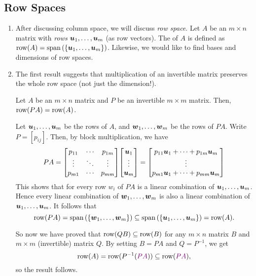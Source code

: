 \subsection{Row Spaces}
\begin{enumerate}
\item After discussing column space, we will discuss \emph{row space}. Let
\(A\) be an \(m\times n\) matrix with \emph{rows}
\(\vb*{u}_1,\dotsc,\vb*{u}_m\) (as row vectors). The  of
\(A\) is defined as \(\operatorname{row}(A)=\operatorname{span}\qty(\{\vb*{u}_1,\dotsc,\vb*{u}_m\})\).
Likewise, we would like to find bases and dimensions of row spaces.

\item The first result suggests that multiplication of an invertible matrix
preserves the whole row space (not just the dimension!).

\begin{theorem}
\label{thm:mult-inv-matx-preserv-row-space}
Let \(A\) be an \(m\times n\) matrix and \(P\) be an invertible \(m\times m\)
matrix. Then, \(\operatorname{row}(PA)=\operatorname{row}(A)\).
\end{theorem}
\begin{pf}
Let \(\vb*{u}_1,\dotsc,\vb*{u}_m\) be the rows of \(A\), and
\(\vb*{w}_1,\dotsc,\vb*{w}_m\) be the rows of \(PA\). Write \(P=[p_{ij}]\).
Then, by block multiplication, we have
\[
PA=\mqty[p_{11}&\cdots&p_{1m}\\ \vdots&\ddots&\vdots\\ p_{m1}&\cdots&p_{mm}]
\mqty[\vect{u}_1\\ \vdots\\ \vect{u}_m]
=\mqty[
p_{11}\vect{u}_1+\dotsb+p_{1m}\vect{u}_m\\
\vdots\\
p_{m1}\vect{u}_1+\dotsb+p_{mm}\vect{u}_m
]
\]
This shows that for every row \(w_i\) of \(PA\) is a linear combination of
\(\vb*{u}_1,\dotsc,\vb*{u}_m\). Hence every linear combination of
\(\vb*{w}_1,\dotsc,\vb*{w}_m\) is also a linear combination of
\(\vb*{u}_1,\dotsc,\vb*{u}_m\). It follows that
\[
\operatorname{row}(PA)=\operatorname{span}\qty(\{\vb*{w}_1,\dotsc,\vb*{w}_m\})\subseteq
\operatorname{span}\qty(\{\vb*{u}_1,\dotsc,\vb*{u}_m\})=\operatorname{row}(A).
\]

So now we have proved that \(\operatorname{row}(QB)\subseteq\operatorname{row}(B)\) for any \(m\times n\)
matrix \(B\) and \(m\times m\) (invertible) matrix \(Q\). By setting \(B=PA\)
and \(Q=P^{-1}\), we get
\[
\operatorname{row}(A)=\operatorname{row}(P^{-1}({\color{violet}PA}))\subseteq \operatorname{row}({\color{violet}PA}),
\]
so the result follows.
\end{pf}


\end{enumerate}
